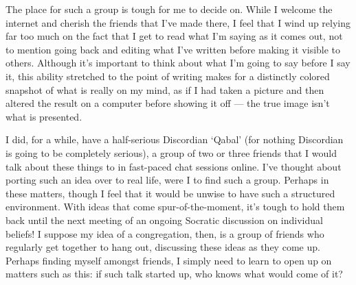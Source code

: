 The place for such a group is tough for me to decide on. While I welcome the internet and cherish the friends that I've made there, I feel that I wind up relying far too much on the fact that I get to read what I'm saying as it comes out, not to mention going back and editing what I've written before making it visible to others. Although it's important to think about what I'm going to say before I say it, this ability stretched to the point of writing makes for a distinctly colored snapshot of what is really on my mind, as if I had taken a picture and then altered the result on a computer before showing it off --- the true image isn't what is presented.

I did, for a while, have a half-serious Discordian `Qabal' (for nothing Discordian is going to be completely serious), a group of two or three friends that I would talk about these things to in fast-paced chat sessions online. I've thought about porting such an idea over to real life, were I to find such a group. Perhaps in these matters, though I feel that it would be unwise to have such a structured environment. With ideas that come spur-of-the-moment, it's tough to hold them back until the next meeting of an ongoing Socratic discussion on individual beliefs! I suppose my idea of a congregation, then, is a group of friends who regularly get together to hang out, discussing these ideas as they come up. Perhaps finding myself amongst friends, I simply need to learn to open up on matters such as this: if such talk started up, who knows what would come of it?
